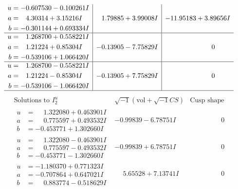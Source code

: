 \documentclass[1p]{elsarticle_modified}
\theoremstyle{definition}
\newcommand{\I}{\sqrt{-1}}
\begin{document}
$$\begin{array}{c|c|c}
\begin{aligned}
u &= -0.607530 - 0.100261 I \\
a &= \phantom{-}4.30314 + 3.15216 I \\
b &= -0.301144 + 0.693334 I\end{aligned}
 & \phantom{-}1.79885 + 3.99008 I & -11.95183 + 3.89656 I \\ \hline\begin{aligned}
u &= \phantom{-}1.268700 + 0.558221 I \\
a &= \phantom{-}1.21224 + 0.85304 I \\
b &= -0.539106 + 1.066420 I\end{aligned}
 & -0.13905 - 7.75829 I & \phantom{-0.000000 } 0 \\ \hline\begin{aligned}
u &= \phantom{-}1.268700 - 0.558221 I \\
a &= \phantom{-}1.21224 - 0.85304 I \\
b &= -0.539106 - 1.066420 I\end{aligned}
 & -0.13905 + 7.75829 I & \phantom{-0.000000 } 0\\
 \hline 
 \end{array}$$\newpage$$\begin{array}{c|c|c}  
\text{Solutions to }I^u_{2}& \I (\text{vol} + \sqrt{-1}CS) & \text{Cusp shape}\\
 \hline 
\begin{aligned}
u &= \phantom{-}1.322080 + 0.463901 I \\
a &= \phantom{-}0.775597 + 0.493532 I \\
b &= -0.453771 + 1.302660 I\end{aligned}
 & -0.99839 - 6.78751 I & \phantom{-0.000000 } 0 \\ \hline\begin{aligned}
u &= \phantom{-}1.322080 - 0.463901 I \\
a &= \phantom{-}0.775597 - 0.493532 I \\
b &= -0.453771 - 1.302660 I\end{aligned}
 & -0.99839 + 6.78751 I & \phantom{-0.000000 } 0 \\ \hline\begin{aligned}
u &= -1.180370 + 0.771323 I \\
a &= -0.707864 + 0.647021 I \\
b &= \phantom{-}0.883774 - 0.518629 I\end{aligned}
 & \phantom{-}5.65528 + 7.13741 I & \phantom{-0.000000 } 0 \\ \hline\begin{aligned}

\end{aligned}
\end{array}$$
\end{document}
